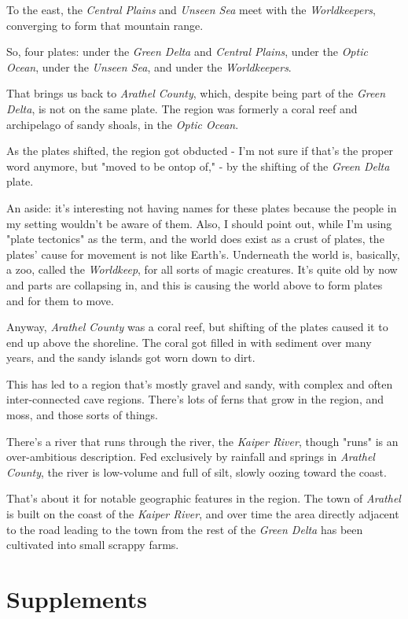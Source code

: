 \documentclass[11pt]{article}
\begin{document}
To the east, the \emph{Central Plains} and \emph{Unseen Sea} meet with the
\emph{Worldkeepers}, converging to form that mountain range.

So, four plates: under the \emph{Green Delta} and \emph{Central Plains}, under
the \emph{Optic Ocean}, under the \emph{Unseen Sea}, and under the
\emph{Worldkeepers}.

That brings us back to \emph{Arathel County}, which, despite being part of
the \emph{Green Delta}, is not on the same plate. The region was formerly a
coral reef and archipelago of sandy shoals, in the \emph{Optic Ocean}.

As the plates shifted, the region got obducted - I'm not sure if
that's the proper word anymore, but "moved to be ontop of," - by the
shifting of the \emph{Green Delta} plate.

An aside: it's interesting not having names for these plates because
the people in my setting wouldn't be aware of them. Also, I should
point out, while I'm using "plate tectonics" as the term, and the
world does exist as a crust of plates, the plates' cause for movement
is not like Earth's. Underneath the world is, basically, a zoo, called
the \emph{Worldkeep}, for all sorts of magic creatures. It's quite old by
now and parts are collapsing in, and this is causing the world above
to form plates and for them to move.

Anyway, \emph{Arathel County} was a coral reef, but shifting of the plates
caused it to end up above the shoreline. The coral got filled in with
sediment over many years, and the sandy islands got worn down to dirt.

This has led to a region that's mostly gravel and sandy, with complex
and often inter-connected cave regions. There's lots of ferns that
grow in the region, and moss, and those sorts of things.

There's a river that runs through the river, the \emph{Kaiper River},
though "runs" is an over-ambitious description. Fed exclusively by
rainfall and springs in \emph{Arathel County}, the river is low-volume and
full of silt, slowly oozing toward the coast.

That's about it for notable geographic features in the region. The
town of \emph{Arathel} is built on the coast of the \emph{Kaiper River}, and
over time the area directly adjacent to the road leading to the town
from the rest of the \emph{Green Delta} has been cultivated into small
scrappy farms.
\stopcontents[level-1]
\section*{Supplements}
\label{sec:org63a4c1b}
\end{document}
